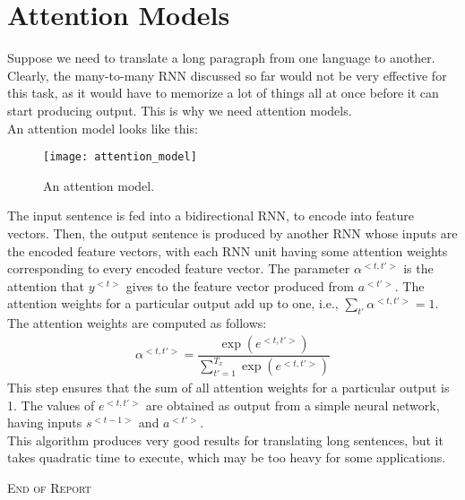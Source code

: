 \documentclass[a4paper, 12pt]{report}
\begin{document}
\section{Attention Models}
Suppose we need to translate a long paragraph from one language to another. Clearly, the many-to-many RNN discussed so far would not be very effective for this task, as it would have to memorize a lot of things all at once before it can start producing output. This is why we need attention models.\\
\break
An attention model looks like this:
\begin{figure}[H]
\centering
\texttt{[image: attention\_model]}
\caption{An attention model.}
\end{figure}
The input sentence is fed into a bidirectional RNN, to encode into feature vectors. Then, the output sentence is produced by another RNN whose inputs are the encoded feature vectors, with each RNN unit having some attention weights corresponding to every encoded feature vector. The parameter $\alpha^{<t,t'>}$ is the attention that $y^{<t>}$ gives to the feature vector produced from $a^{<t'>}$. The attention weights for a particular output add up to one, i.e., $\sum_{t'}\alpha^{<t,t'>}=1$.\\
\break
The attention weights are computed as follows:
\begin{align*}
\alpha^{<t,t'>} = \dfrac{\exp\left(e^{<t,t'>}\right)}{\sum_{t'=1}^{T_x}\exp\left(e^{<t,t'>}\right)}
\end{align*}
This step ensures that the sum of all attention weights for a particular output is 1. The values of $e^{<t,t'>}$ are obtained as output from a simple neural network, having inputs $s^{<t-1>}$ and $a^{<t'>}$.\\
\break
This algorithm produces very good results for translating long sentences, but it takes quadratic time to execute, which may be too heavy for some applications.

\newpage

\vspace*{\fill}
\begin{center}
{\huge\scshape End of Report}
\end{center}
\vspace*{\fill}
\end{document}
